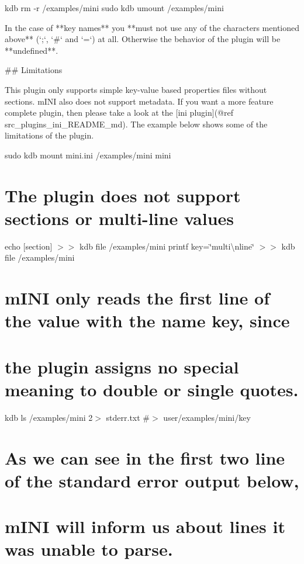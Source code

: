kdb rm -\/r /examples/mini sudo kdb umount /examples/mini 
\begin{DoxyCode}
In the case of **key names** you **must not use any of the characters mentioned above** (`;`, `#` and `=`)
       at all. Otherwise the behavior of the plugin will be **undefined**.

## Limitations

This plugin only supports simple key-value based properties files without sections. mINI also does not
       support metadata. If you want a more feature complete plugin, then please take a look at the [ini plugin](@ref
       src\_plugins\_ini\_README\_md). The example below shows some of the limitations of the plugin.
\end{DoxyCode}
 sudo kdb mount mini.\+ini /examples/mini mini

\section*{The plugin does not support sections or multi-\/line values}

echo \textquotesingle{}\mbox{[}section\mbox{]}\textquotesingle{} $>$$>$ {\ttfamily kdb file /examples/mini} printf \textquotesingle{}key=\char`\"{}multi\textbackslash{}nline\char`\"{}\textquotesingle{} $>$$>$ {\ttfamily kdb file /examples/mini}

\section*{m\+I\+NI only reads the first line of the value with the name {\ttfamily key}, since}

\section*{the plugin assigns no special meaning to double or single quotes.}

kdb ls /examples/mini 2$>$ stderr.\+txt \#$>$ user/examples/mini/key

\section*{As we can see in the first two line of the standard error output below,}

\section*{m\+I\+NI will inform us about lines it was unable to parse.}

